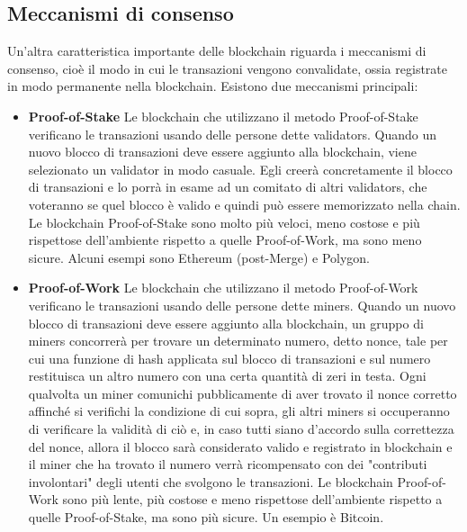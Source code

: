 \documentclass[12pt]{report}
\begin{document}
\subsection{Meccanismi di consenso}
Un'altra caratteristica importante delle blockchain riguarda i meccanismi di consenso, cioè il modo in cui le transazioni vengono convalidate, ossia registrate in modo permanente nella blockchain.
Esistono due meccanismi principali:
\begin{itemize}[topsep=5pt, itemsep=0pt]
    \item \textbf{Proof-of-Stake}\newline
    Le blockchain che utilizzano il metodo Proof-of-Stake verificano le transazioni usando delle persone dette validators.\newline
    Quando un nuovo blocco di transazioni deve essere aggiunto alla blockchain, viene selezionato un validator in modo casuale. Egli creerà concretamente il blocco di transazioni e lo porrà in esame ad un comitato di altri validators, che voteranno se quel blocco è valido e quindi può essere memorizzato nella chain.\newline
    Le blockchain Proof-of-Stake sono molto più veloci, meno costose e più rispettose dell'ambiente rispetto a quelle Proof-of-Work, ma sono meno sicure.\newline
    Alcuni esempi sono Ethereum (post-Merge) e Polygon.
    \item \textbf{Proof-of-Work}\newline
    Le blockchain che utilizzano il metodo Proof-of-Work verificano le transazioni usando delle persone dette miners.\newline
    Quando un nuovo blocco di transazioni deve essere aggiunto alla blockchain, un gruppo di miners concorrerà per trovare un determinato numero, detto nonce, tale per cui una funzione di hash applicata sul blocco di transazioni e sul numero restituisca un altro numero con una certa quantità di zeri in testa.\newline
    Ogni qualvolta un miner comunichi pubblicamente di aver trovato il nonce corretto affinché si verifichi la condizione di cui sopra, gli altri miners si occuperanno di verificare la validità di ciò e, in caso tutti siano d'accordo sulla correttezza del nonce, allora il blocco sarà considerato valido e registrato in blockchain e il miner che ha trovato il numero verrà ricompensato con dei "contributi involontari" degli utenti che svolgono le transazioni.\newline
    Le blockchain Proof-of-Work sono più lente, più costose e meno rispettose dell'ambiente rispetto a quelle Proof-of-Stake, ma sono più sicure.\newline
    Un esempio è Bitcoin. \cite{Quattro}
\end{itemize}
\end{document}
